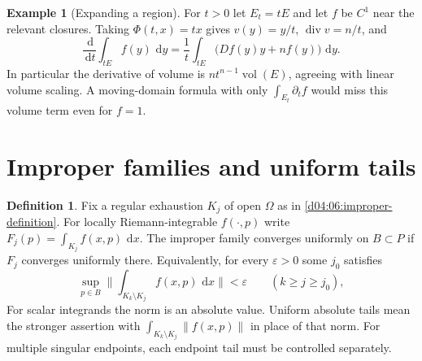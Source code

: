\documentclass[11pt,oneside,openany]{book}
\theoremstyle{definition}
\newtheorem{definition}[theorem]{Definition}
\newtheorem{example}[theorem]{Example}
\theoremstyle{remark}
\newcommand{\eps}{\varepsilon}
\newcommand{\norm}[1]{\lVert#1\rVert}
\newcommand{\dd}{\,\mathrm d}
\DeclareMathOperator{\vol}{vol}
\newcommand{\family}[1]{}
\begin{document}
\begin{example}[Expanding a region]\label{d04:08:expansion}
For $t>0$ let $E_t=tE$ and let $f$ be $C^1$ near the relevant closures. Taking $\Phi(t,x)=tx$ gives $v(y)=y/t$, $\operatorname{div}v=n/t$, and
\[
 \frac{\dd}{\dd t}\int_{tE}f(y)\,\dd y
 =\frac1t\int_{tE}\big(Df(y)y+nf(y)\big)\,\dd y.
\]
In particular the derivative of volume is $nt^{n-1}\vol(E)$, agreeing with linear volume scaling. A moving-domain formula with only $\int_{E_t}\partial_tf$ would miss this volume term even for $f=1$.
\end{example}

\section{Improper families and uniform tails}
\family{K04.08.07}
\begin{definition}\label{d04:08:uniform-tails}
Fix a regular exhaustion $K_j$ of open $\Omega$ as in \cref{d04:06:improper-definition}. For locally Riemann-integrable $f(\cdot,p)$ write $F_j(p)=\int_{K_j}f(x,p)\,\dd x$. The improper family converges uniformly on $B\subset P$ if $F_j$ converges uniformly there. Equivalently, for every $\eps>0$ some $j_0$ satisfies
\[
 \sup_{p\in B}\norm{\int_{K_k\setminus K_j}f(x,p)\,\dd x}<\eps
 \qquad(k\geq j\geq j_0),
\]
For scalar integrands the norm is an absolute value. Uniform absolute tails mean the stronger assertion with $\int_{K_k\setminus K_j}\norm{f(x,p)}$ in place of that norm. For multiple singular endpoints, each endpoint tail must be controlled separately.
\end{definition}
\end{document}
